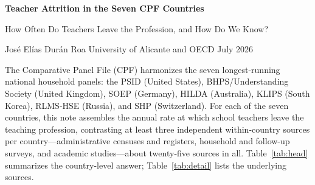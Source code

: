 \documentclass[11pt,a4paper]{article}
\begin{document}
\begin{center}
{\fontsize{15}{20}\selectfont\bfseries
Teacher Attrition in the Seven CPF Countries\par}
\vspace{4pt}
{\fontsize{11.5}{15}\selectfont
How Often Do Teachers Leave the Profession, and How Do We Know?\par}
\vspace{8pt}
{\small José Elías Durán Roa \quad\textcolor{ecgray}{University of
Alicante and OECD} \quad\textcolor{ecgray}{July 2026}}
\end{center}
\vspace{4pt}

The Comparative Panel File (CPF) harmonizes the seven longest-running
national household panels: the PSID (United States), BHPS/Understanding
Society (United Kingdom), SOEP (Germany), HILDA (Australia), KLIPS
(South Korea), RLMS-HSE (Russia), and SHP (Switzerland). For each of
the seven countries, this note assembles the annual rate at which
school teachers leave the teaching profession, contrasting at least
three independent within-country sources per country---administrative
censuses and registers, household and follow-up surveys, and academic
studies---about twenty-five sources in all. Table~\ref{tab:head}
summarizes the country-level answer; Table~\ref{tab:detail} lists the
underlying sources.
\end{document}
